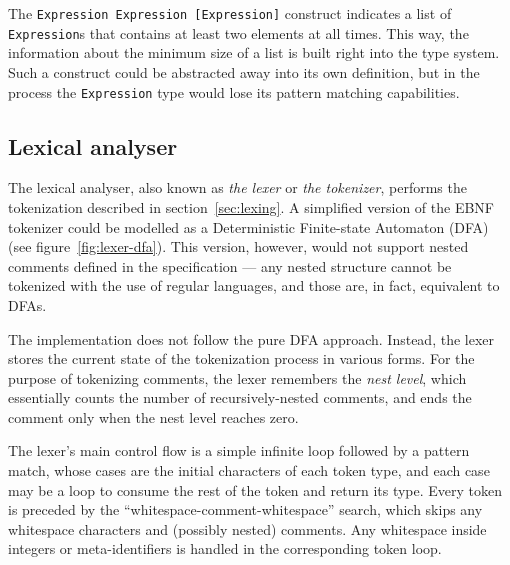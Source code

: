 \documentclass[english,engineering]{wizthesis}
\begin{document}

The \texttt{Expression Expression [Expression]} construct indicates a list of
\texttt{Expression}s that contains at least two elements at all times. This way,
the information about the minimum size of a list is built right into the type
system. Such a construct could be abstracted away into its own definition, but
in the process the \texttt{Expression} type would lose its pattern matching
capabilities.

\subsection{Lexical analyser} \label{sbs:lexical-analyser}

The lexical analyser, also known as \emph{the lexer} or \emph{the tokenizer},
performs the tokenization described in section~\ref{sec:lexing}. A simplified
version of the EBNF tokenizer could be modelled as a Deterministic Finite-state
Automaton (DFA) (see figure~\ref{fig:lexer-dfa}). This version, however, would
not support nested comments defined in the specification --- any nested
structure cannot be tokenized with the use of regular languages, and those are,
in fact, equivalent to DFAs.

The implementation does not follow the pure DFA approach. Instead, the lexer
stores the current state of the tokenization process in various forms. For the
purpose of tokenizing comments, the lexer remembers the \emph{nest level}, which
essentially counts the number of recursively-nested comments, and ends the
comment only when the nest level reaches zero.

The lexer's main control flow is a simple infinite loop followed by a pattern
match, whose cases are the initial characters of each token type, and each
case may be a loop to consume the rest of the token and return its type.
Every token is preceded by the ``whitespace-comment-whitespace'' search, which
skips any whitespace characters and (possibly nested) comments. Any whitespace
inside integers or meta-identifiers is handled in the corresponding token loop.
\end{document}
